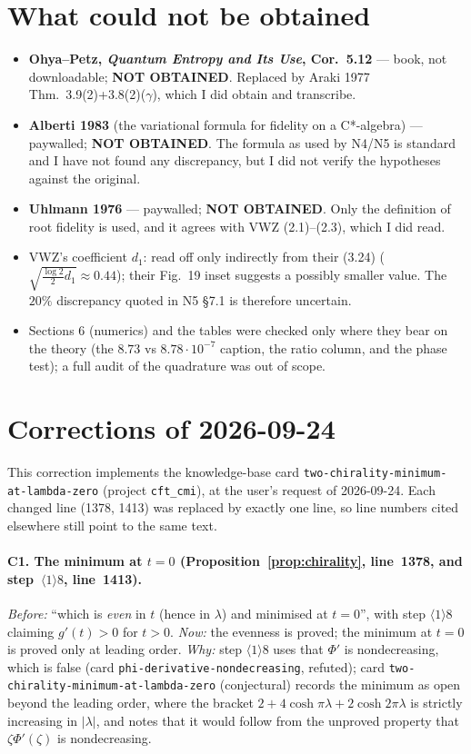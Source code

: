 \documentclass[11pt]{article}
\begin{document}
\section*{What could not be obtained}
\begin{itemize}
\item \textbf{Ohya--Petz, \emph{Quantum Entropy and Its Use}, Cor.~5.12} --- book, not
downloadable; \textbf{NOT OBTAINED}.  Replaced by Araki 1977 Thm.\ 3.9(2)+3.8(2)($\gamma$), which
I did obtain and transcribe.
\item \textbf{Alberti 1983} (the variational formula for fidelity on a C*-algebra) --- paywalled;
\textbf{NOT OBTAINED}.  The formula as used by N4/N5 is standard and I have not found any
discrepancy, but I did not verify the hypotheses against the original.
\item \textbf{Uhlmann 1976} --- paywalled; \textbf{NOT OBTAINED}.  Only the definition of root
fidelity is used, and it agrees with VWZ (2.1)--(2.3), which I did read.
\item VWZ's coefficient $d_1$: read off only indirectly from their (3.24)
($\sqrt{\tfrac{\log2}2d_1}\approx0.44$); their Fig.~19 inset suggests a possibly smaller value.
The $20\%$ discrepancy quoted in N5 \S7.1 is therefore uncertain.
\item Sections 6 (numerics) and the tables were checked only where they bear on the theory
(the $8.73$ vs $8.78\cdot10^{-7}$ caption, the ratio column, and the phase test); a full audit of
the quadrature was out of scope.
\end{itemize}
\section*{Corrections of 2026-09-24}
{\sloppy
This correction implements the knowledge-base card \texttt{two-chirality-minimum-at-lambda-zero} (project
\texttt{cft\_cmi}), at the user's request of 2026-09-24.  Each changed line (1378, 1413) was replaced by exactly one line,
so line numbers cited elsewhere still point to the same text.
\paragraph{C1. The minimum at \(t=0\) (Proposition~\ref{prop:chirality}, line~1378, and step~\(\langle1\rangle8\), line~1413).}
\emph{Before:} ``which is \emph{even} in \(t\) (hence in \(\lambda\)) and minimised at \(t=0\)'', with step
\(\langle1\rangle8\) claiming \(g'(t)>0\) for \(t>0\).
\emph{Now:} the evenness is proved; the minimum at \(t=0\) is proved only at leading order.
\emph{Why:} step \(\langle1\rangle8\) uses that \(\Phi'\) is nondecreasing, which is false (card
\texttt{phi-derivative-nondecreasing}, refuted); card \texttt{two-chirality-minimum-at-lambda-zero} (conjectural) records the
minimum as open beyond the leading order, where the bracket \(2+4\cosh\pi\lambda+2\cosh2\pi\lambda\) is strictly increasing
in \(|\lambda|\), and notes that it would follow from the unproved property that \(\zeta\Phi'(\zeta)\) is nondecreasing.
\par}
\end{document}
